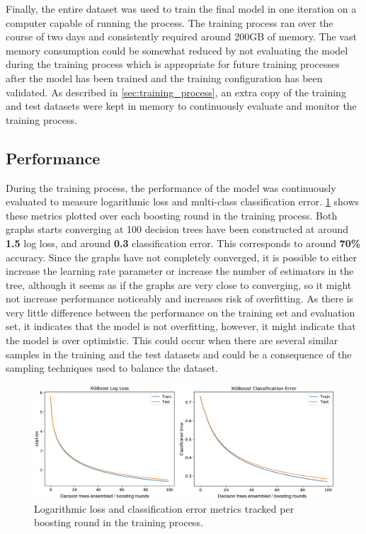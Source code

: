 Finally, the entire dataset was used to train the final model in one iteration on a computer capable of running the process. The training process ran over the course of two days and consistently required around 200GB of memory. The vast memory consumption could be somewhat reduced by not evaluating the model during the training process which is appropriate for future training processes after the model has been trained and the training configuration has been validated. As described in \cref{sec:training_process}, an extra copy of the training and test datasets were kept in memory to continuously evaluate and monitor the training process.

\subsection{Performance}

During the training process, the performance of the model was continuously evaluated to measure logarithmic loss and multi-class classification error. \cref{fig:eval_set} shows these metrics plotted over each boosting round in the training process. Both graphs starts converging at 100 decision trees have been constructed at around \textbf{1.5} log loss, and around \textbf{0.3} classification error. This corresponds to around \textbf{70\%} accuracy. Since the graphs have not completely converged, it is possible to either increase the learning rate parameter or increase the number of estimators in the tree, although it seems as if the graphs are very close to converging, so it might not increase performance noticeably and increases risk of overfitting. As there is very little difference between the performance on the training set and evaluation set, it indicates that the model is not overfitting, however, it might indicate that the model is over optimistic. This could occur when there are several similar samples in the training and the test datasets and could be a consequence of the sampling techniques used to balance the dataset.

\begin{figure}[htbp]
    \centering
    \includegraphics[width=1.0\textwidth]{figures/results/eval_set}
    \caption{Logarithmic loss and classification error metrics tracked per boosting round in the training process.}
    \label{fig:eval_set}
\end{figure}

